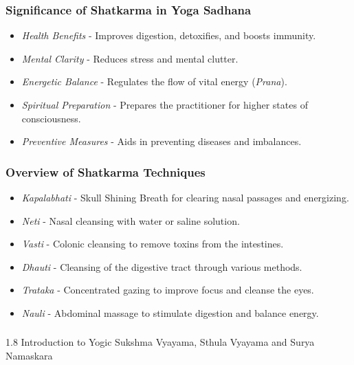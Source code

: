 \begin{frame}[fragile]\frametitle{Significance of Shatkarma in Yoga Sadhana}

      \begin{itemize}
		\item \textit{Health Benefits} - Improves digestion, detoxifies, and boosts immunity.
		\item \textit{Mental Clarity} - Reduces stress and mental clutter.
		\item \textit{Energetic Balance} - Regulates the flow of vital energy (\textit{Prana}).
		\item \textit{Spiritual Preparation} - Prepares the practitioner for higher states of consciousness.
		\item \textit{Preventive Measures} - Aids in preventing diseases and imbalances.
	  \end{itemize}

\end{frame}

\begin{frame}[fragile]\frametitle{Overview of Shatkarma Techniques}

      \begin{itemize}
		\item \textit{Kapalabhati} - Skull Shining Breath for clearing nasal passages and energizing.
		\item \textit{Neti} - Nasal cleansing with water or saline solution.
		\item \textit{Vasti} - Colonic cleansing to remove toxins from the intestines.
		\item \textit{Dhauti} - Cleansing of the digestive tract through various methods.
		\item \textit{Trataka} - Concentrated gazing to improve focus and cleanse the eyes.
		\item \textit{Nauli} - Abdominal massage to stimulate digestion and balance energy.
	  \end{itemize}

\end{frame}


\begin{frame}[fragile]\frametitle{}
\begin{center}
{\Large 1.8 Introduction to Yogic  Sukshma Vyayama,  Sthula Vyayama and Surya Namaskara}
\end{center}
\end{frame}

